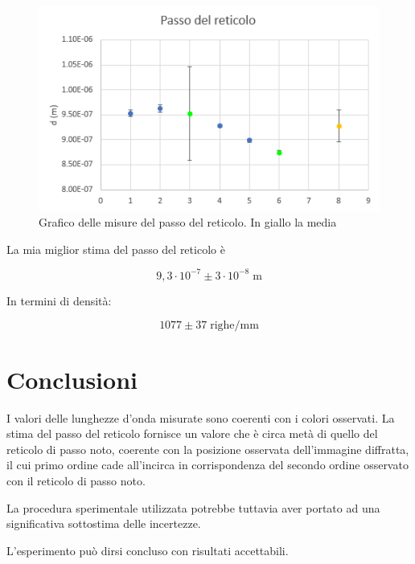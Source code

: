 \documentclass{article}
\begin{document}
\begin{figure}[h!]
  \centering
  \includegraphics[width=0.6\linewidth]{IM grafico_d_megl}
  \caption{Grafico delle misure del passo del reticolo. In giallo la media}
\end{figure}

La mia miglior stima del passo del reticolo è

\[9,3 \cdot 10^{-7} \pm 3 \cdot 10^{-8} \; \textrm{m}\]

In termini di densità:

\[1077 \pm 37 \; \textrm{righe}/\textrm{mm}\]

\section{Conclusioni}

I valori delle lunghezze d'onda misurate sono coerenti con i colori osservati. La stima del passo del reticolo fornisce un valore che è circa metà di quello del reticolo di passo noto, coerente con la posizione osservata dell'immagine diffratta, il cui primo ordine cade all'incirca in corrispondenza del secondo ordine osservato con il reticolo di passo noto. 

La procedura sperimentale utilizzata potrebbe tuttavia aver portato ad una significativa sottostima delle incertezze.

\vspace{5mm}

L'esperimento può dirsi concluso con risultati accettabili.
\end{document}
